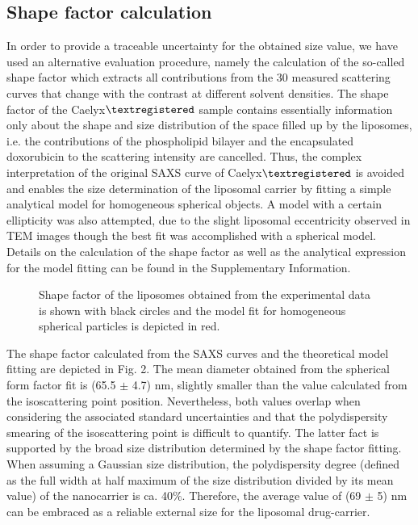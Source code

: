 \subsection{Shape factor calculation}
In order to provide a traceable uncertainty for the obtained size value, we have used an alternative evaluation procedure, namely the calculation of the so-called shape factor which extracts all contributions from the 30 measured scattering curves that change with the contrast at different solvent densities. The shape factor of the Caelyx$\textregistered$ sample contains essentially information only about the shape and size distribution of the space filled up by the liposomes, i.e. the contributions of the phospholipid bilayer and the encapsulated doxorubicin to the scattering intensity are cancelled.  Thus, the complex interpretation of the original SAXS curve of Caelyx$\textregistered$ is avoided and enables the size determination of the liposomal carrier by fitting a simple analytical model for homogeneous spherical objects. A model with a certain ellipticity was also attempted, due to the slight liposomal eccentricity observed in TEM images though the best fit was accomplished with a spherical model. Details on the calculation of the shape factor as well as the analytical expression for the model fitting can be found in the Supplementary Information. 

\begin{figure}
	\centering
		
		\caption{Shape factor of the liposomes obtained from the experimental data is shown with black circles and the model fit for homogeneous spherical particles is depicted in red.}
		\label{fig:CaelyxIodixanolResonantTerm}
\end{figure}

The shape factor calculated from the SAXS curves and the theoretical model fitting are depicted in Fig. 2. The mean diameter obtained from the spherical form factor fit is (65.5 $\pm$ 4.7) nm, slightly smaller than the value calculated from the isoscattering point position. Nevertheless, both values overlap when considering the associated standard uncertainties and that the polydispersity smearing of the isoscattering point is difficult to quantify. The latter fact is supported by the broad size distribution determined by the shape factor fitting. When assuming a Gaussian size distribution, the polydispersity degree (defined as the full width at half maximum of the size distribution divided by its mean value) of the nanocarrier is ca. 40$\%$. Therefore, the average value of (69 $\pm$ 5) nm can be embraced as a reliable external size for the liposomal drug-carrier.

